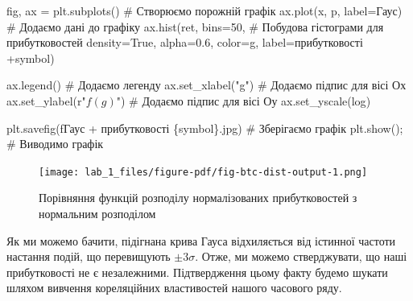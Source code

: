 \documentclass[
  letterpaper,
]{report}
\newenvironment{Shaded}{\begin{snugshade}}{\end{snugshade}}
\newcommand{\CommentTok}[1]{\textcolor[rgb]{0.37,0.37,0.37}{#1}}
\newcommand{\DecValTok}[1]{\textcolor[rgb]{0.68,0.00,0.00}{#1}}
\newcommand{\FloatTok}[1]{\textcolor[rgb]{0.68,0.00,0.00}{#1}}
\newcommand{\NormalTok}[1]{\textcolor[rgb]{0.00,0.23,0.31}{#1}}
\newcommand{\OperatorTok}[1]{\textcolor[rgb]{0.37,0.37,0.37}{#1}}
\newcommand{\SpecialCharTok}[1]{\textcolor[rgb]{0.37,0.37,0.37}{#1}}
\newcommand{\SpecialStringTok}[1]{\textcolor[rgb]{0.13,0.47,0.30}{#1}}
\newcommand{\StringTok}[1]{\textcolor[rgb]{0.13,0.47,0.30}{#1}}
\newcommand{\VariableTok}[1]{\textcolor[rgb]{0.07,0.07,0.07}{#1}}
\newcommand{\VerbatimStringTok}[1]{\textcolor[rgb]{0.13,0.47,0.30}{#1}}
\begin{document}
\begin{Shaded}
\begin{Highlighting}[]
\NormalTok{fig, ax }\OperatorTok{=}\NormalTok{ plt.subplots()                   }\CommentTok{\# Створюємо порожній графік}
\NormalTok{ax.plot(x, p, label}\OperatorTok{=}\StringTok{\textquotesingle{}Гаус\textquotesingle{}}\NormalTok{)                }\CommentTok{\# Додаємо дані до графіку}
\NormalTok{ax.hist(ret, bins}\OperatorTok{=}\DecValTok{50}\NormalTok{,                      }\CommentTok{\# Побудова гістограми для прибутковостей}
\NormalTok{        density}\OperatorTok{=}\VariableTok{True}\NormalTok{, }
\NormalTok{        alpha}\OperatorTok{=}\FloatTok{0.6}\NormalTok{, }
\NormalTok{        color}\OperatorTok{=}\StringTok{\textquotesingle{}g\textquotesingle{}}\NormalTok{,}
\NormalTok{        label}\OperatorTok{=}\StringTok{\textquotesingle{}прибутковості \textquotesingle{}}\OperatorTok{+}\NormalTok{symbol)}

\NormalTok{ax.legend()                                }\CommentTok{\# Додаємо легенду}
\NormalTok{ax.set\_xlabel(}\StringTok{"g"}\NormalTok{)                         }\CommentTok{\# Додаємо підпис для вісі Ох}
\NormalTok{ax.set\_ylabel(}\VerbatimStringTok{r"$f(g)$"}\NormalTok{)                   }\CommentTok{\# Додаємо підпис для вісі Оу}
\NormalTok{ax.set\_yscale(}\StringTok{\textquotesingle{}log\textquotesingle{}}\NormalTok{)}


\NormalTok{plt.savefig(}\SpecialStringTok{f\textquotesingle{}Гаус + прибутковості }\SpecialCharTok{\{}\NormalTok{symbol}\SpecialCharTok{\}}\SpecialStringTok{.jpg\textquotesingle{}}\NormalTok{)       }\CommentTok{\# Зберігаємо графік }
\NormalTok{plt.show()}\OperatorTok{;}                                             \CommentTok{\# Виводимо графік}
\end{Highlighting}
\end{Shaded}

\begin{figure}[H]

{\centering \texttt{[image: lab\_1\_files/figure-pdf/fig-btc-dist-output-1.png]}

}

\caption{\label{fig-btc-dist}Порівняння функцій розподілу нормалізованих
прибутковостей з нормальним розподілом}

\end{figure}

Як ми можемо бачити, підігнана крива Гауса відхиляється від істинної
частоти настання подій, що перевищують \(\pm 3\sigma\). Отже, ми можемо
стверджувати, що наші прибутковості не є незалежними. Підтвердження
цьому факту будемо шукати шляхом вивчення кореляційних властивостей
нашого часового ряду.
\end{document}
